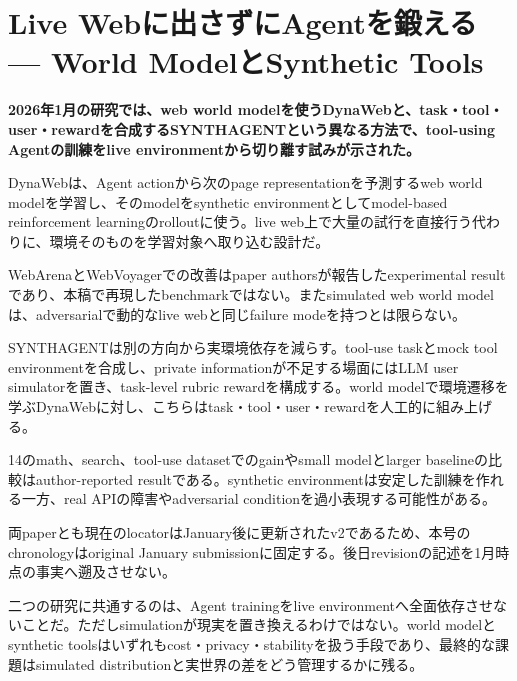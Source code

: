 \section{Live Webに出さずにAgentを鍛える — World ModelとSynthetic Tools}
\label{pkg:training-agents-offline}
\noindent\textbf{2026年1月の研究では、web world modelを使うDynaWebと、task・tool・user・rewardを合成するSYNTHAGENTという異なる方法で、tool-using Agentの訓練をlive environmentから切り離す試みが示された。}\autocite{src-01d8ab4a2c6f,src-85bc3e4f7b39}

DynaWebは、Agent actionから次のpage representationを予測するweb world modelを学習し、そのmodelをsynthetic environmentとしてmodel-based reinforcement learningのrolloutに使う。live web上で大量の試行を直接行う代わりに、環境そのものを学習対象へ取り込む設計だ。\autocite{src-85bc3e4f7b39}


\begin{claimboundary}
WebArenaとWebVoyagerでの改善はpaper authorsが報告したexperimental resultであり、本稿で再現したbenchmarkではない。またsimulated web world modelは、adversarialで動的なlive webと同じfailure modeを持つとは限らない。\autocite{src-85bc3e4f7b39}
\end{claimboundary}

SYNTHAGENTは別の方向から実環境依存を減らす。tool-use taskとmock tool environmentを合成し、private informationが不足する場面にはLLM user simulatorを置き、task-level rubric rewardを構成する。world modelで環境遷移を学ぶDynaWebに対し、こちらはtask・tool・user・rewardを人工的に組み上げる。\autocite{src-01d8ab4a2c6f}


\begin{claimboundary}
14のmath、search、tool-use datasetでのgainやsmall modelとlarger baselineの比較はauthor-reported resultである。synthetic environmentは安定した訓練を作れる一方、real APIの障害やadversarial conditionを過小表現する可能性がある。\autocite{src-01d8ab4a2c6f}
\end{claimboundary}

\begin{claimboundary}
両paperとも現在のlocatorはJanuary後に更新されたv2であるため、本号のchronologyはoriginal January submissionに固定する。後日revisionの記述を1月時点の事実へ遡及させない。\autocite{src-01d8ab4a2c6f,src-85bc3e4f7b39}
\end{claimboundary}

二つの研究に共通するのは、Agent trainingをlive environmentへ全面依存させないことだ。ただしsimulationが現実を置き換えるわけではない。world modelとsynthetic toolsはいずれもcost・privacy・stabilityを扱う手段であり、最終的な課題はsimulated distributionと実世界の差をどう管理するかに残る。\autocite{src-01d8ab4a2c6f,src-85bc3e4f7b39}
